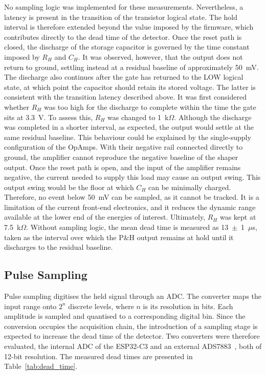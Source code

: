 No sampling logic was implemented for these measurements. Nevertheless, a latency is present in the transition of the transistor logical state. The hold interval is therefore extended beyond the value imposed by the firmware, which contributes directly to the dead time of the detector. Once the reset path is closed, the discharge of the storage capacitor is governed by the time constant imposed by $R_H$ and $C_H$. It was observed, however, that the output does not return to ground, settling instead at a residual baseline of approximately 50~mV. The discharge also continues after the gate has returned to the LOW logical state, at which point the capacitor should retain its stored voltage. The latter is consistent with the transition latency described above. It was first considered whether $R_H$ was too high for the discharge to complete within the time the gate sits at 3.3~V. To assess this, $R_H$ was changed to 1~k$\Omega$. Although the discharge was completed in a shorter interval, as expected, the output would settle at the same residual baseline. This behaviour could be explained by the single-supply configuration of the OpAmps. With their negative rail connected directly to ground, the amplifier cannot reproduce the negative baseline of the shaper output. Once the reset path is open, and the input of the amplifier remains negative, the current needed to supply this load may cause an output swing. This output swing would be the floor at which $C_H$ can be minimally charged. Therefore, no event below 50~mV can be sampled, as it cannot be tracked. It is a limitation of the current front-end electronics, and it reduces the dynamic range available at the lower end of the energies of interest. Ultimately, $R_H$ was kept at 7.5~k$\Omega$. Without sampling logic, the mean dead time is measured as 13~$\pm$~1~$\mu$s, taken as the interval over which the P\&H output remains at hold until it discharges to the residual baseline.


\subsection{Pulse Sampling}
\label{sec:pulse_sampling}
Pulse sampling digitises the held signal through an ADC. The converter maps the input range onto $2^n$ discrete levels, where $n$ is its resolution in bits. Each amplitude is sampled and quantised to a corresponding digital bin. Since the conversion occupies the acquisition
chain, the introduction of a sampling stage is expected to increase the dead time of the detector. Two converters were therefore evaluated, the internal ADC of the ESP32-C3 and an external ADS7883~\cite{ADS7883}, both of 12-bit resolution. The measured dead times are presented in Table~\ref{tab:dead_time}.

